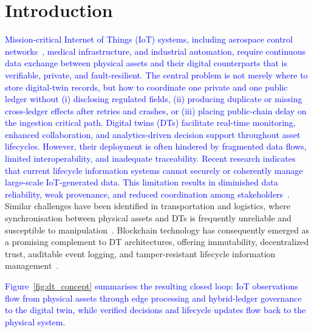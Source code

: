 \documentclass[final,5p,times,twocolumn]{elsarticle}
\begin{document}



\section{\textbf{Introduction}}
\label{int}
\textcolor{blue}{Mission-critical Internet of Things (IoT) systems, including aerospace control networks~\cite{},
medical infrastructure, and industrial automation, require continuous data exchange between
physical assets and their digital counterparts that is verifiable, private, and
fault-resilient. The central problem is not merely where to store digital-twin records, but how to coordinate one private and one public ledger without (i) disclosing regulated fields, (ii) producing duplicate or missing cross-ledger effects after retries and crashes, or (iii) placing public-chain delay on the ingestion critical path. Digital twins (DTs) facilitate real-time monitoring, enhanced
collaboration, and analytics-driven decision support throughout asset lifecycles. However, their
deployment is often hindered by fragmented data flows, limited interoperability, and
inadequate traceability. Recent research indicates that current lifecycle information systems
cannot securely or coherently manage large-scale IoT-generated data. This limitation results in
diminished data reliability, weak provenance, and reduced coordination among
stakeholders~\cite{sadri2023integration}.}
Similar challenges have been identified in transportation and logistics, where
synchronisation between physical assets and DTs is frequently unreliable and susceptible to
manipulation~\cite{cunat2024blockchain}.
Blockchain technology has consequently emerged as a promising complement to DT architectures,
offering immutability, decentralized trust, auditable event logging, and tamper-resistant
lifecycle information management~\cite{kanu2024blockchain}.

\textcolor{blue}{Figure~\ref{fig:dt_concept} summarises the resulting closed loop: IoT observations
flow from physical assets through edge processing and hybrid-ledger governance to the digital
twin, while verified decisions and lifecycle updates flow back to the physical system.}
\end{document}
